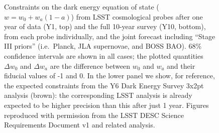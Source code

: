 \begin{figure}
\begin{center}
  \end{center}
  \vskip -0.2in
  \caption{Constraints on the dark energy equation of state ($w = w_0 +
  w_a(1-a)$) from LSST cosmological probes after one year of data (Y1,
  top) and the full 10-year survey (Y10, bottom), from each probe
  individually, and the joint forecast including ``Stage III priors''
  (i.e.\ Planck, JLA supernovae, and BOSS BAO).
  68\%
  confidence intervals are shown in all cases; the plotted quantities
  $\Delta w_0$ and $\Delta w_a$ are the difference between $w_0$ and
  $w_a$ and their fiducial values of -1 and 0.
  In the lower panel we show, for reference, the expected constraints
  from the Y6 Dark Energy Survey 3x2pt analysis (brown): the corresponding LSST analysis is already expected to be higher precision than this after just 1 year.
  Figures reproduced with permission from the LSST DESC Science Requirements Document v1 \citep{2018arXiv180901669T} and related analysis.
  \label{Fig:DEellipses}}
\end{figure}







